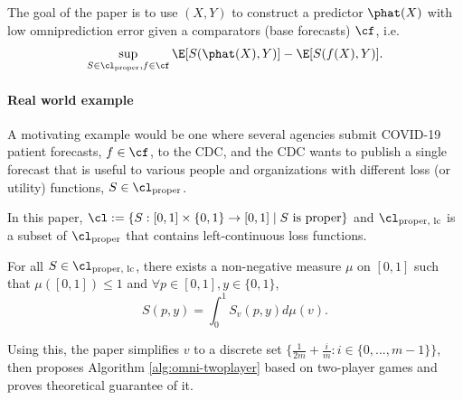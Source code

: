 The goal of the paper is to use $(X,Y)$ to construct a predictor $\phat(X)$ with low omniprediction error given a comparators (base forecasts) $\cf$, i.e.
\[
\sup_{S\in\cl_{\text{proper}}, f\in\cf} \E[S(\phat(X), Y)] - \E[S(f(X), Y)].
\]

\paragraph{Real world example}
A motivating example would be one where several agencies submit COVID-19 patient forecasts, $f\in \cf$, to the CDC, and the CDC wants to publish a single forecast that is useful to various people and organizations with different loss (or utility) functions, $S \in \cl_{\text{proper}}$.

In this paper, $\cl := \{S:[0,1]\times \{0,1\} \to [0,1] \mid S \text{ is proper}\}$ and $\cl_{\text{proper, lc}}$ is a subset of $\cl_{\text{proper}}$ that contains left-continuous loss functions. 

\begin{theorem}
    For all $S \in \cl_{\text{proper, lc}}$, there exists a non-negative measure $\mu$ on $[0,1]$ such that $\mu([0,1])\leq 1$ and $\forall p \in [0,1], y \in \{0,1\}$,
    \[
    S(p, y) = \int_0^1 S_v(p,y)d\mu(v).
    \]
\end{theorem}
Using this, the paper simplifies $v$ to a discrete set $\{\frac{1}{2m}+\frac{i}{m}: i \in \{0, ..., m-1\}\}$, then proposes Algorithm \ref{alg:omni-twoplayer} based on two-player games and proves theoretical guarantee of it.



